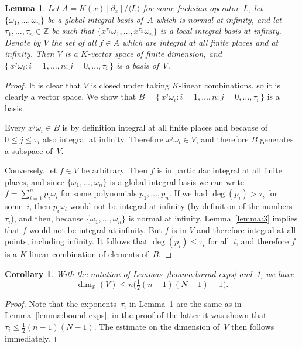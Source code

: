 \documentclass[final,1p,times,authoryear]{elsarticle}
\newtheorem{corollary}[theorem]{Corollary}
\newtheorem{lemma}[theorem]{Lemma}
\def\<#1>{\langle#1\rangle}
\let\set\mathbb
\begin{document}
\begin{lemma}\label{lemma:nopoles-space}
  Let $A=K(x)[\partial_x]/\<L>$ for some fuchsian operator~$L$, let
  $\{\omega_1,\dots,\omega_n\}$ be a global integral basis of~$A$ which is
  normal at infinity, and let $\tau_1,\dots,\tau_n\in\set Z$ be such that
  $\{x^{\tau_1}\omega_1,\dots,x^{\tau_n}\omega_n\}$ is a local integral basis
  at infinity. Denote by $V$ the set of all $f\in A$ which are integral at all
  finite places and at infinity.  Then $V$ is a $K$-vector space of finite
  dimension, and $\{\,x^j\omega_i : i=1,\dots,n; j=0,\dots,\tau_i\,\}$ is a
  basis of~$V$.
\end{lemma}
\begin{proof}
  It is clear that $V$ is closed under taking $K$-linear combinations, so it is clearly a vector space.
  We show that $B=\{\,x^j\omega_i : i=1,\dots,n; j=0,\dots,\tau_i\,\}$ is a basis.

  Every $x^j\omega_i\in B$ is by definition integral at all finite places and because of $0\leq j\leq \tau_i$ also
  integral at infinity. Therefore $x^j\omega_i\in V$, and therefore $B$ generates a subspace of~$V$.

  Conversely, let $f\in V$ be arbitrary. Then $f$ is in particular integral at all finite places,
  and since $\{\omega_1,\dots,\omega_n\}$ is a global integral basis we can write $f=\sum_{i=1}^n p_i\omega_i$
  for some polynomials $p_1,\dots,p_n$.
  If we had $\deg(p_i)>\tau_i$ for some~$i$, then $p_i\omega_i$ would not be integral at infinity
  (by definition of the numbers~$\tau_i$), and then, because $\{\omega_1,\dots,\omega_n\}$ is normal
  at infinity, Lemma~\ref{lemma:3} implies that $f$ would not be integral at infinity.
  But $f$ is in $V$ and therefore integral at all points, including infinity.
  It follows that $\deg(p_i)\leq \tau_i$ for all~$i$, and therefore $f$ is a $K$-linear combination
  of elements of~$B$.
\end{proof}

\begin{corollary}
With the notation of Lemmas~\ref{lemma:bound-exps}
and~\ref{lemma:nopoles-space}, we have
\[
  \dim_{\set K}(V)\leq n\bigl(\tfrac12(n-1)(N-1)+1\bigr).
\]
\end{corollary}
\begin{proof}
Note that the exponents~$\tau_i$ in Lemma~\ref{lemma:nopoles-space} are the
same as in Lemma~\ref{lemma:bound-exps}; in the proof of the latter it was
shown that $\tau_i\leq\frac12(n-1)(N-1)$. The estimate on the dimension of~$V$
then follows immediately.
\end{proof}
\end{document}
